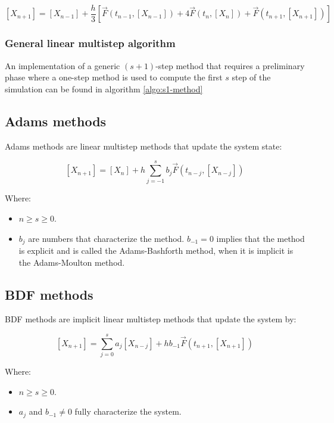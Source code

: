     $$[X_{n+1}] = [X_{n-1}] + \frac{h}{3}[\vec{F}(t_{n-1}, [X_{n-1}]) + 4\vec{F}(t_n, [X_n]) + \vec{F}(t_{n+1}, [X_{n+1}])]$$

    \subsubsection{General linear multistep algorithm}
    An implementation of a generic $(s+1)$-step method that requires a preliminary phase where a one-step method is used to compute the first $s$ step of the simulation can be found in algorithm \ref{algo:s1-method}

    

  \subsection{Adams methods}
  Adams methods are linear multistep methods that update the system state:

  $$[X_{n+1}] = [X_n] + h\sum\limits_{j=-1}^sb_j\vec{F}(t_{n-j}, [X_{n-j}])$$

  Where:

  \begin{multicols}{2}
    \begin{itemize}
      \item $n\ge s\ge 0$.
      \item $b_j$ are numbers that characterize the method.
        $b_{-1} = 0$ implies that the method is explicit and is called the Adams-Bashforth method, when it is implicit is the Adams-Moulton method.
    \end{itemize}
  \end{multicols}

  \subsection{BDF methods}
  BDF methods are implicit linear multistep methods that update the system by:

  $$[X_{n+1}] = \sum\limits_{j=0}^sa_j[X_{n-j}] + hb_{-1}\vec{F}(t_{n+1}, [X_{n+1}])$$

  Where:

  \begin{multicols}{2}
    \begin{itemize}
      \item $n\ge s\ge 0$.
      \item $a_j$ and $b_{-1}\neq 0$ fully characterize the system.
    \end{itemize}
  \end{multicols}

